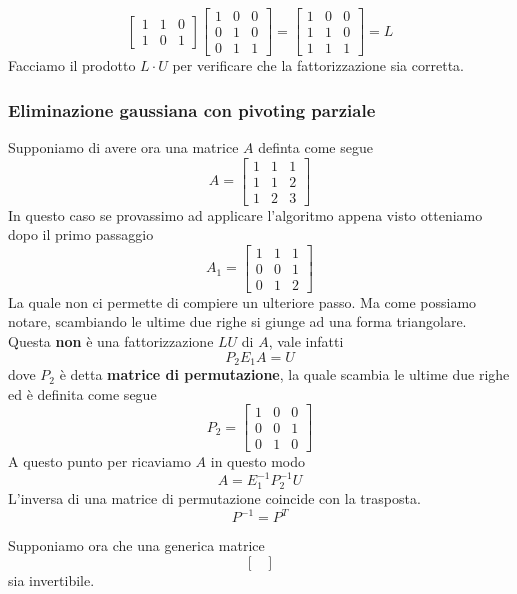 \begin{example}
\[\begin{bmatrix}
			1 & 1 & 0 \\
			1 & 0 & 1
		\end{bmatrix} \begin{bmatrix}
			1 & 0 & 0 \\
			0 & 1 & 0 \\
			0 & 1 & 1
		\end{bmatrix} = \begin{bmatrix}
			1 & 0 & 0 \\
			1 & 1 & 0 \\
			1 & 1 & 1
		\end{bmatrix} = L
	\]
	Facciamo il prodotto $L \cdot U$ per verificare che la fattorizzazione sia corretta.
\end{example}

\subsubsection{Eliminazione gaussiana con pivoting parziale}
Supponiamo di avere ora una matrice $A$ definta come segue
\[
	A = \begin{bmatrix}
		1 & 1 & 1 \\
		1 & 1 & 2 \\
		1 & 2 & 3
	\end{bmatrix}
\]
In questo caso se provassimo ad applicare l'algoritmo appena visto otteniamo dopo il primo passaggio
\[
	A_1 = \begin{bmatrix}
		1 & 1 & 1 \\
		0 & 0 & 1 \\
		0 & 1 & 2
	\end{bmatrix}
\]
La quale non ci permette di compiere un ulteriore passo. Ma come possiamo notare, scambiando le ultime due righe
si giunge ad una forma triangolare. Questa \textbf{non} è una fattorizzazione $LU$ di $A$, vale infatti
\[ P_2 E_1 A = U \]
dove $P_2$ è detta \textbf{matrice di permutazione}, la quale scambia le ultime due righe ed è definita come
segue
\[
	P_2 = \begin{bmatrix}
		1 & 0 & 0 \\
		0 & 0 & 1 \\
		0 & 1 & 0
	\end{bmatrix}
\]
A questo punto per ricaviamo $A$ in questo modo
\[ A = E_1^{-1} P_2^{-1} U \]
L'inversa di una matrice di permutazione coincide con la trasposta.
\[ P^{-1} = P^T \]

Supponiamo ora che una generica matrice
\[
	\begin{bmatrix}

	\end{bmatrix}
\]
sia invertibile.